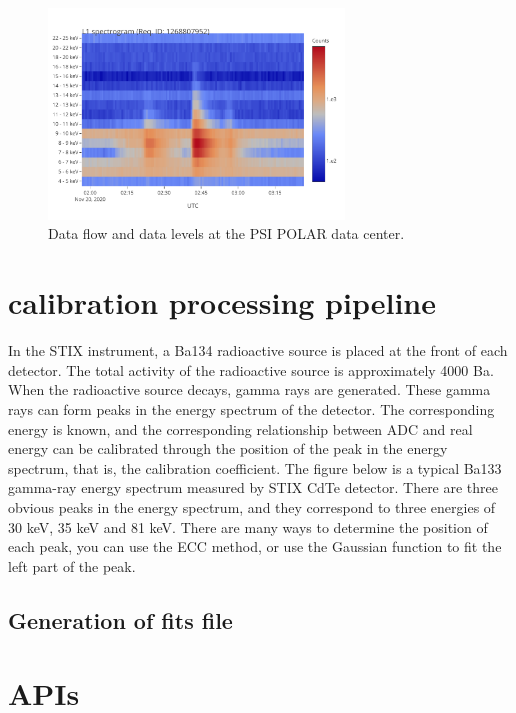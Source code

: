 \documentclass[preprint,11pt]{elsarticle}
\begin{document}
\begin{figure}[!htb]
\begin{center}
\includegraphics[width=0.7\textwidth]{l1-spectrogram.pdf}
\caption{Data flow and data levels at the PSI POLAR data center. }
\label{fig:det-view}
\end{center}
\end{figure}

\section{calibration processing pipeline}

In the STIX instrument, a Ba134 radioactive source is placed at the front of each detector. The total activity of the radioactive source is approximately 4000 Ba.
When the radioactive source decays, gamma rays are generated. These gamma rays can form peaks in the energy spectrum of the detector.
The corresponding energy is known, and the corresponding relationship between ADC and real energy can be calibrated through the position of the peak in the energy spectrum, that is, the calibration coefficient. The figure below is a typical Ba133 gamma-ray energy spectrum measured by STIX CdTe detector. There are three obvious peaks in the energy spectrum, and they correspond to three energies of 30 keV, 35 keV and 81 keV. There are many ways to determine the position of each peak, you can use the ECC method, or use the Gaussian function to fit the left part of the peak.

\subsection{Generation of fits file}

\section{ APIs}
\end{document}
